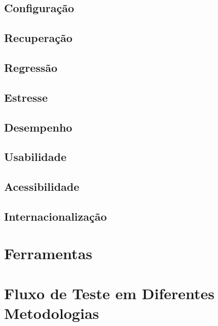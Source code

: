 \documentclass[
	12pt,				%
	openright,			%
	twoside,			%
	a4paper,			%
	english,			%
	brazil,				%
	]{abntex2}
\begin{document}
\subsection{Configuração}


\subsection{Recuperação}


\subsection{Regressão}


\subsection{Estresse}


\subsection{Desempenho}


\subsection{Usabilidade}


\subsection{Acessibilidade}


\subsection{Internacionalização}

\section{Ferramentas}

\section{Fluxo de Teste em Diferentes Metodologias}

\end{document}
